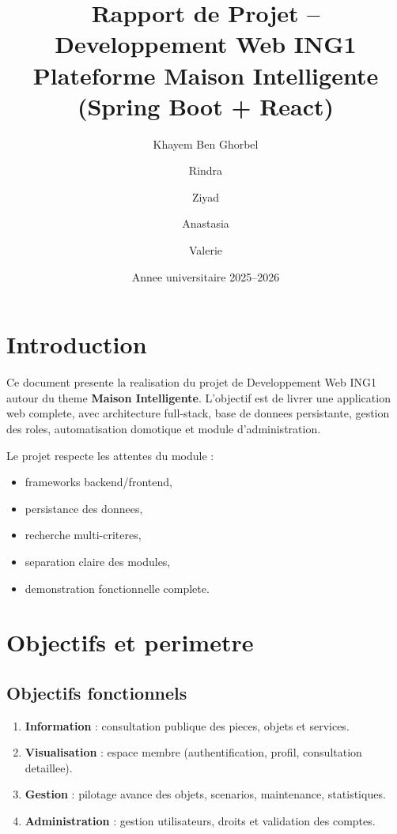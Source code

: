 \documentclass[11pt,a4paper]{article}
\title{\textbf{Rapport de Projet -- Developpement Web ING1}\\
\large Plateforme Maison Intelligente (Spring Boot + React)}
\author{Khayem Ben Ghorbel \and Rindra \and Ziyad \and Anastasia \and Valerie}
\date{Annee universitaire 2025--2026}
\begin{document}
\maketitle
\tableofcontents
\newpage

\section{Introduction}

Ce document presente la realisation du projet de Developpement Web ING1 autour du theme
\textbf{Maison Intelligente}. L'objectif est de livrer une application web complete,
avec architecture full-stack, base de donnees persistante, gestion des roles,
automatisation domotique et module d'administration.

Le projet respecte les attentes du module :
\begin{itemize}
  \item frameworks backend/frontend,
  \item persistance des donnees,
  \item recherche multi-criteres,
  \item separation claire des modules,
  \item demonstration fonctionnelle complete.
\end{itemize}

\section{Objectifs et perimetre}

\subsection{Objectifs fonctionnels}
\begin{enumerate}
  \item \textbf{Information} : consultation publique des pieces, objets et services.
  \item \textbf{Visualisation} : espace membre (authentification, profil, consultation detaillee).
  \item \textbf{Gestion} : pilotage avance des objets, scenarios, maintenance, statistiques.
  \item \textbf{Administration} : gestion utilisateurs, droits et validation des comptes.
\end{enumerate}
\end{document}
